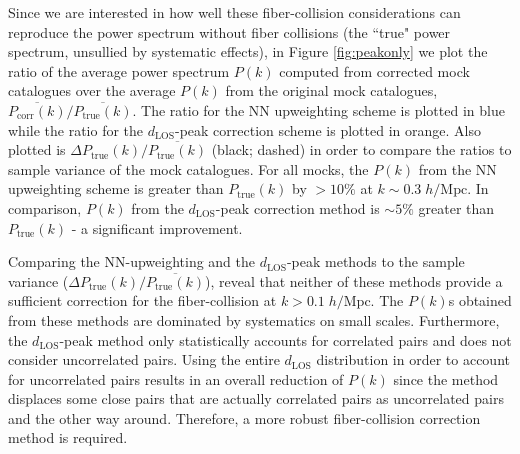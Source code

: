 \documentclass{emulateapj}
\begin{document}
Since we are interested in how well these fiber-collision considerations can reproduce the power spectrum without fiber collisions (the ``true" power spectrum, unsullied by systematic effects), in Figure \ref{fig:peakonly} we plot the ratio of the average power spectrum $P(k)$ computed from corrected mock catalogues over the average $P(k)$ from the original mock catalogues, $\overline{P_{\mathrm{corr}}(k)}/\overline{P_\mathrm{true}(k)}$. The ratio for the NN upweighting scheme is plotted in blue while the ratio for the $d_{\mathrm{LOS}}$-peak correction scheme is plotted in orange. Also plotted is $\Delta P_\mathrm{true}(k) / \overline{P_\mathrm{true}(k)}$ (black; dashed) in order to compare the ratios to sample variance of the mock catalogues. For all mocks, the $P(k)$ from the NN upweighting scheme is greater than $P_\mathrm{true}(k)$ by $> 10 \%$ at $ k \sim 0.3\; h/\mathrm{Mpc}$. In comparison, $P(k)$ from the $d_\mathrm{LOS}$-peak correction method is $\sim 5\%$ greater than $P_\mathrm{true}(k)$ - a significant improvement. 

Comparing the NN-upweighting and the $d_\mathrm{LOS}$-peak methods to the sample variance ($\Delta P_\mathrm{true}(k) / \overline{P_\mathrm{true}(k)}$), reveal that neither of these methods provide a sufficient correction for the fiber-collision at $k > 0.1\; h/\mathrm{Mpc}$. The $P(k)$s obtained from these methods are dominated by systematics on small scales. Furthermore, the $d_\mathrm{LOS}$-peak method only statistically accounts for correlated pairs and does not consider uncorrelated pairs. Using the entire $d_\mathrm{LOS}$ distribution in order to account for uncorrelated pairs results in an overall reduction of $P(k)$ since the method displaces some close pairs that are actually correlated pairs as uncorrelated pairs and the other way around. Therefore, a more robust fiber-collision correction method is required. 
\end{document}
